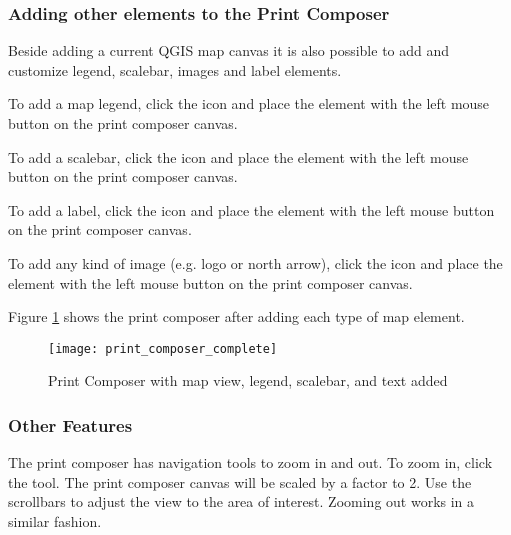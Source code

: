\subsubsection{Adding other elements to the Print Composer} 

Beside adding a current QGIS map canvas it is also possible to add and customize legend, 
scalebar, images and label elements.


To add a map legend, click the  icon and place 
the element with the left mouse button on the print composer canvas.


To add a scalebar, click the  icon and place 
the element with the left mouse button on the print composer canvas.


To add a label, click the  icon and place the element 
with the left mouse button on the print composer canvas.


To add any kind of image (e.g. logo or north arrow), click the 
 icon and place the element 
with the left mouse button on the print composer canvas.


Figure \ref{fig:print_composer_complete} shows the print composer after adding
each type of map element.
\begin{figure}[h]
   \begin{center}
   \caption{Print Composer with map view, legend, scalebar, and text added}
   \label{fig:print_composer_complete}\smallskip
   \texttt{[image: print\_composer\_complete]}
\end{center}  
\end{figure}

\subsubsection{Other Features}

The print composer has navigation tools to zoom in and out. To zoom in, click
the  tool. The print composer canvas will be scaled by a factor to 2. Use
the scrollbars to adjust the view to the area of interest. Zooming out works
in a similar fashion.

